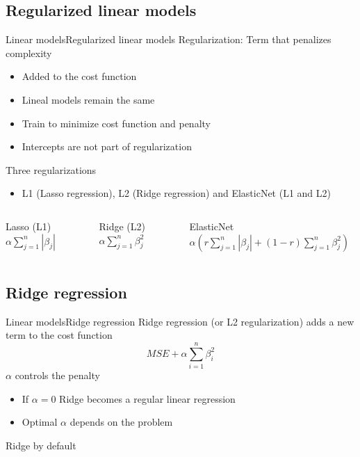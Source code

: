 \documentclass[10pt,compress]{beamer} %
\begin{document}
\subsection{Regularized linear models}
\begin{frame}{Linear models}{Regularized linear models}
	\alert{Regularization}: Term that penalizes complexity
	\begin{itemize}
		\item Added to the cost function
        \item Lineal models remain the same
        \item Train to minimize cost function and penalty
        \item Intercepts are not part of regularization
	\end{itemize}

    Three regularizations
	\begin{itemize}
		\item L1 (Lasso regression),  L2 (Ridge regression) and ElasticNet (L1 and L2)
	\end{itemize}

    \begin{columns}
    		\begin{block}{Lasso (L1)}
            	$\alpha \sum_{j=1}^n |\beta_j|$
        	\end{block}

     		\begin{block}{Ridge (L2)}
            	$\alpha \sum_{j=1}^n \beta_j^2$
        	\end{block}

     		\begin{block}{ElasticNet}
			   $\alpha \left( r \sum_{j=1}^n |\beta_j| + (1-r) \sum_{j=1}^n \beta_j^2 \right)$
        	\end{block}
    \end{columns}
\end{frame}

\subsection{Ridge regression}
\begin{frame}{Linear models}{Ridge regression}
	Ridge regression (or L2 regularization) adds a new term to the cost function
    \begin{equation*}
        MSE + \alpha \sum_{i=1}^n \beta_i^2
    \end{equation*}
    $\alpha$ controls the penalty
	\begin{itemize}
		\item If $\alpha = 0$ Ridge becomes a regular linear regression
        \item Optimal $\alpha$ depends on the problem
	\end{itemize}
    Ridge by default
\end{frame}
\end{document}
